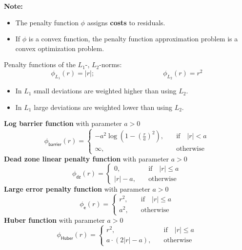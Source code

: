   \textbf{Note:} 
  \begin{itemize}
    \item The penalty function $\phi$ assigns \textbf{costs} to residuals. 
    \item If $\phi$ is a convex function, the penalty function approximation problem is a convex optimization problem.
  \end{itemize}
  Penalty functions of the $L_1$-,  $L_2$-norms:
  \begin{displaymath}
    \phi_{L_1}(r) = |r|;  \qquad \qquad \qquad \qquad \qquad \phi_{L_2}(r) = r^2
  \end{displaymath}
  \begin{itemize}
    \item In $L_1$ small deviations are weighted higher than using $L_2$.
    \item In $L_1$ large deviations are weighted lower than using $L_2$.
  \end{itemize}
 \textbf{Log barrier function} with parameter $a>0$
  \begin{displaymath}
    \phi_\mathsf{barrier}(r) = 
      \left\{
        \begin{array}{cl}
          -a^2\log \left(1-\left( \frac{r}{a}\right)^2 \right),  & \quad \mbox{if} \quad |r| < a\\
          \infty,                                                & \quad \mbox{otherwise}
        \end{array}
      \right.
  \end{displaymath}   
  \textbf{Dead zone linear penalty function} with parameter $a>0$
  \begin{displaymath}
    \phi_\mathsf{dz}(r) = 
      \left\{
        \begin{array}{cl}
          0,     & \quad \mbox{if} \quad |r| \leq a\\
          |r|-a, & \quad \mbox{otherwise}
        \end{array}
      \right.
  \end{displaymath}
  \textbf{Large error penalty function} with parameter $a>0$
  \begin{displaymath}
    \phi_\mathsf{e}(r) = 
      \left\{
        \begin{array}{cl}
          r^2, & \quad \mbox{if} \quad |r| \leq a \\
          a^2, & \quad \mbox{otherwise}
        \end{array}
      \right.
  \end{displaymath}
  \textbf{Huber function} with parameter $a>0$
  \begin{displaymath}
    \phi_\mathsf{Huber}(r) = 
      \left\{
        \begin{array}{cl}
          r^2,            & \quad \mbox{if} \quad |r| \leq a \\
          a\cdot(2|r|-a), & \quad \mbox{otherwise}
        \end{array}
      \right.
  \end{displaymath}
  
